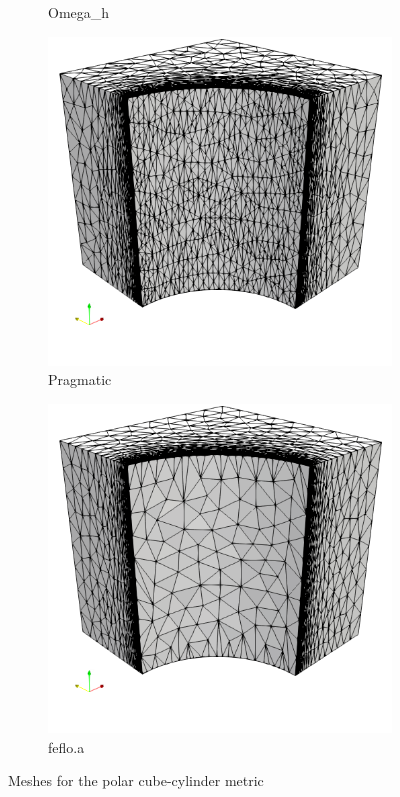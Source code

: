 \documentclass[3p,times,procedia,number]{elsarticle}
\begin{document}
\begin{figure}
\begin{subfigure}{.24\textwidth}
\caption{Omega\_h}
\label{fig:omega_h-cube-cylinder-polar-1-mesh}
\end{subfigure}
\begin{subfigure}{.24\textwidth}
\centering
\includegraphics[width=\textwidth]{pragmatic-cube-cylinder-polar-1.png}
\caption{Pragmatic}
\end{subfigure}
\begin{subfigure}{.24\textwidth}
\centering
\includegraphics[width=\textwidth]{fefloa-cube-cylinder-polar-1.png}
\caption{feflo.a}
\label{fig:fefloa-cube-cylinder-polar-1-mesh}
\end{subfigure}
\caption{Meshes for the polar cube-cylinder metric}
\label{fig:cube-cylinder-polar-1-meshes}
\end{figure}
\end{document}
